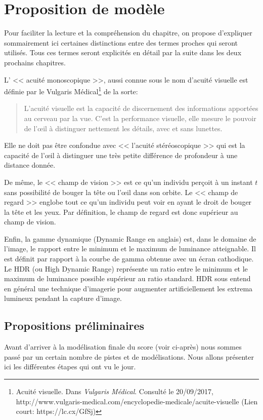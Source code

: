 	\chapter{Proposition de modèle}
	
	\par Pour faciliter la lecture et la compréhension du chapitre, on propose d'expliquer sommairement ici certaines distinctions entre des termes proches qui seront utilisés. Tous ces termes seront explicités en détail par la suite dans les deux prochains chapitres.

	\par L' << acuité monoscopique >>, aussi connue sous le nom d'acuité visuelle est définie par le Vulgaris Médical\footnote{Acuité visuelle. Dans \textit{Vulgaris Médical}. Consulté le 20/09/2017, http://www.vulgaris-medical.com/encyclopedie-medicale/acuite-visuelle (Lien court: https://lc.cx/GfSj)} de la sorte:
	\begin{quote}
		L'acuité visuelle est la capacité de discernement des informations apportées au cerveau par la vue. C'est la performance visuelle, elle mesure le pouvoir de l'œil à distinguer nettement les détails, avec et sans lunettes.
	\end{quote}
	Elle ne doit pas être confondue avec << l'acuité stéréoscopique >> qui est la capacité de l'œil à distinguer une très petite différence de profondeur à une distance donnée.
	
	\par De même, le << champ de vision >> est ce qu'un individu perçoit à un instant $t$ sans possibilité de bouger la tête ou l'œil dans son orbite. Le << champ de regard >> englobe tout ce qu'un individu peut voir en ayant le droit de bouger la tête et les yeux. Par définition, le champ de regard est donc supérieur au champ de vision.
	
	\par Enfin, la gamme dynamique (Dynamic Range en anglais) est, dans le domaine de l'image, le rapport entre le minimum et le maximum de luminance atteignable. Il est définit par rapport à la courbe de gamma obtenue avec un écran cathodique. Le HDR (ou High Dynamic Range) représente un ratio entre le minimum et le maximum de luminance possible supérieur au ratio standard. HDR sous entend en général une technique d'imagerie pour augmenter artificiellement les extrema lumineux pendant la capture d'image.
	
	\section{Propositions préliminaires}	
	\par Avant d'arriver à la modélisation finale du score (voir ci-après) nous sommes passé par un certain nombre de pistes et de modélisations. Nous allons présenter ici les différentes étapes qui ont vu le jour.
	

